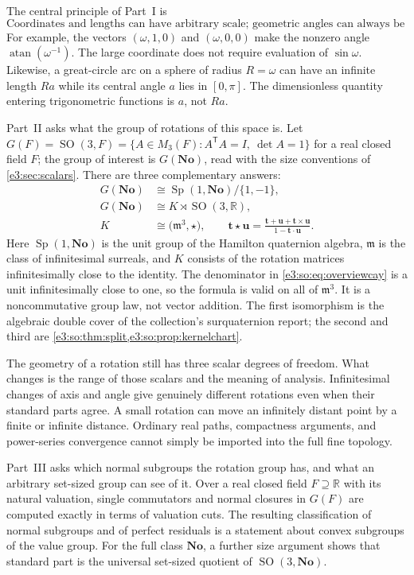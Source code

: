 \documentclass[11pt,letterpaper]{article}
\numberwithin{equation}{section}
\theoremstyle{definition}
\theoremstyle{remark}
\newcommand{\No}{\mathbf{No}}
\newcommand{\R}{\mathbb R}
\newcommand{\mm}{\mathfrak m}
\newcommand{\atan}{\operatorname{atan}}
\newcommand{\SO}{\operatorname{SO}}
\newcommand{\Sp}{\operatorname{Sp}}
\newcommand{\vv}[1]{\bm{#1}}
\newcommand{\transpose}{^{\mathsf T}}
\begin{document}
The central principle of Part~I is
\[
 \boxed{\text{Coordinates and lengths can have arbitrary scale; geometric
 angles can always be finite.}}
\]
For example, the vectors $(\omega,1,0)$ and $(\omega,0,0)$ make the nonzero
angle $\atan(\omega^{-1})$. The large coordinate does not require evaluation of
$\sin\omega$. Likewise, a great-circle arc on a sphere of radius $R=\omega$
can have an infinite length $R a$ while its central angle $a$ lies in $[0,\pi]$.
The dimensionless quantity entering trigonometric functions is $a$, not $Ra$.

Part~II asks what the group of rotations of this space is. Let
\(G(F)=\SO(3,F)=\{A\in M_3(F):A\transpose A=I,\ \det A=1\}\) for a real closed
field $F$; the group of interest is $G(\No)$, read with the size conventions of
\cref{e3:sec:scalars}. There are three complementary answers:
\begin{align}
G(\No)&\cong \Sp(1,\No)/\{1,-1\},\label{e3:so:eq:overviewspin}\\
G(\No)&\cong K\rtimes\SO(3,\R),\label{e3:so:eq:overviewsplit}\\
K&\cong\bigl(\mm^3,\star\bigr),\qquad
 \vv t\star\vv u=\frac{\vv t+\vv u+\vv t\times\vv u}{1-\vv t\cdot\vv u}.\label{e3:so:eq:overviewcay}
\end{align}
Here $\Sp(1,\No)$ is the unit group of the Hamilton quaternion algebra,
$\mm$ is the class of infinitesimal surreals, and $K$ consists of the rotation
matrices infinitesimally close to the identity. The denominator in
\cref{e3:so:eq:overviewcay} is a unit infinitesimally close to one, so the
formula is valid on all of $\mm^3$. It is a noncommutative group law, not
vector addition. The first isomorphism is the algebraic double cover of the
collection's surquaternion report; the second and third are
\cref{e3:so:thm:split,e3:so:prop:kernelchart}.

The geometry of a rotation still has three scalar degrees of freedom. What
changes is the range of those scalars and the meaning of analysis. Infinitesimal
changes of axis and angle give genuinely different rotations even when their
standard parts agree. A small rotation can move an infinitely distant point by
a finite or infinite distance. Ordinary real paths, compactness arguments, and
power-series convergence cannot simply be imported into the full fine topology.

Part~III asks which normal subgroups the rotation group has, and what an
arbitrary set-sized group can see of it. Over a real closed field $F\supseteq\R$
with its natural valuation, single commutators and normal closures in $G(F)$
are computed exactly in terms of valuation cuts. The resulting classification
of normal subgroups and of perfect residuals is a statement about convex
subgroups of the value group. For the full class $\No$, a further size argument
shows that standard part is the universal set-sized quotient of $\SO(3,\No)$.
\end{document}
